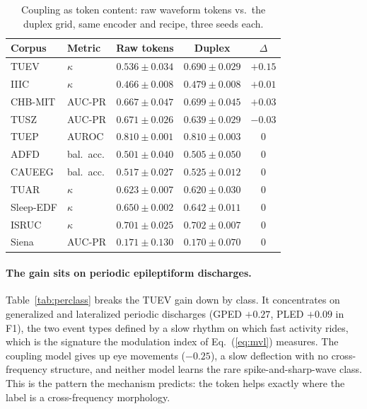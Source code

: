 \begin{table}[t]
\centering
\small
\caption{Coupling as token content: raw waveform tokens vs.\ the duplex
grid, same encoder and recipe, three seeds each.}
\label{tab:coupling}
\begin{tabular}{llccc}
\toprule
Corpus & Metric & Raw tokens & Duplex & $\Delta$ \\
\midrule
TUEV & $\kappa$ & $0.536 \pm 0.034$ & $0.690 \pm 0.029$ & $\mathbf{+0.15}$ \\
IIIC & $\kappa$ & $0.466 \pm 0.008$ & $0.479 \pm 0.008$ & $+0.01$ \\
CHB-MIT & AUC-PR & $0.667 \pm 0.047$ & $0.699 \pm 0.045$ & $+0.03$ \\
TUSZ & AUC-PR & $0.671 \pm 0.026$ & $0.639 \pm 0.029$ & $-0.03$ \\
TUEP & AUROC & $0.810 \pm 0.001$ & $0.810 \pm 0.003$ & $0$ \\
ADFD & bal.\ acc. & $0.501 \pm 0.040$ & $0.505 \pm 0.050$ & $0$ \\
CAUEEG & bal.\ acc. & $0.517 \pm 0.027$ & $0.525 \pm 0.012$ & $0$ \\
TUAR & $\kappa$ & $0.623 \pm 0.007$ & $0.620 \pm 0.030$ & $0$ \\
Sleep-EDF & $\kappa$ & $0.650 \pm 0.002$ & $0.642 \pm 0.011$ & $0$ \\
ISRUC & $\kappa$ & $0.701 \pm 0.025$ & $0.702 \pm 0.007$ & $0$ \\
Siena & AUC-PR & $0.171 \pm 0.130$ & $0.170 \pm 0.070$ & $0$ \\
\bottomrule
\end{tabular}
\end{table}

\paragraph{The gain sits on periodic epileptiform discharges.}
Table~\ref{tab:perclass} breaks the TUEV gain down by class. It concentrates
on generalized and lateralized periodic discharges (GPED $+0.27$, PLED
$+0.09$ in F1), the two event types defined by a slow rhythm on which fast
activity rides, which is the signature the modulation index of
Eq.~(\ref{eq:mvl}) measures. The coupling model gives up eye movements
($-0.25$), a slow deflection with no cross-frequency structure, and neither
model learns the rare spike-and-sharp-wave class. This is the pattern the
mechanism predicts: the token helps exactly where the label is a
cross-frequency morphology.

